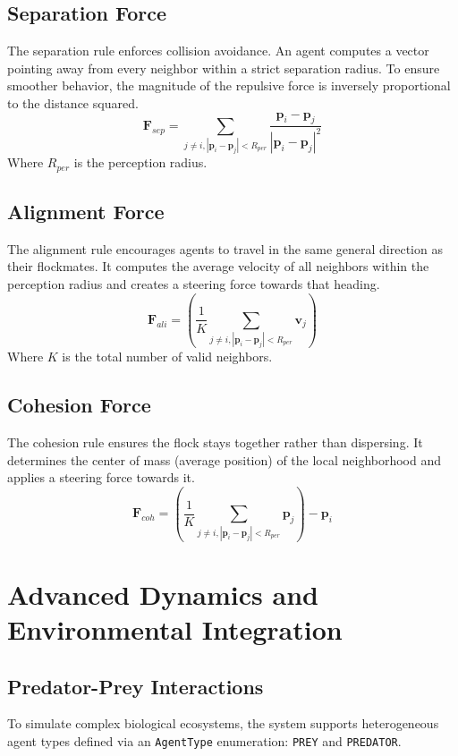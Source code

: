 \documentclass[12pt,a4paper]{report}
\begin{document}
\subsection{Separation Force}
The separation rule enforces collision avoidance. An agent computes a vector pointing away from every neighbor within a strict separation radius. To ensure smoother behavior, the magnitude of the repulsive force is inversely proportional to the distance squared.
\begin{equation}
\mathbf{F}_{sep} = \sum_{j \neq i, |\mathbf{p}_i - \mathbf{p}_j| < R_{per}} \frac{\mathbf{p}_i - \mathbf{p}_j}{|\mathbf{p}_i - \mathbf{p}_j|^2}
\end{equation}
Where $R_{per}$ is the perception radius.

\subsection{Alignment Force}
The alignment rule encourages agents to travel in the same general direction as their flockmates. It computes the average velocity of all neighbors within the perception radius and creates a steering force towards that heading.
\begin{equation}
\mathbf{F}_{ali} = \left( \frac{1}{K} \sum_{j \neq i, |\mathbf{p}_i - \mathbf{p}_j| < R_{per}} \mathbf{v}_j \right)
\end{equation}
Where $K$ is the total number of valid neighbors.

\subsection{Cohesion Force}
The cohesion rule ensures the flock stays together rather than dispersing. It determines the center of mass (average position) of the local neighborhood and applies a steering force towards it.
\begin{equation}
\mathbf{F}_{coh} = \left( \frac{1}{K} \sum_{j \neq i, |\mathbf{p}_i - \mathbf{p}_j| < R_{per}} \mathbf{p}_j \right) - \mathbf{p}_i
\end{equation}

\section{Advanced Dynamics and Environmental Integration}

\subsection{Predator-Prey Interactions}
To simulate complex biological ecosystems, the system supports heterogeneous agent types defined via an \texttt{AgentType} enumeration: \texttt{PREY} and \texttt{PREDATOR}. 
\end{document}

